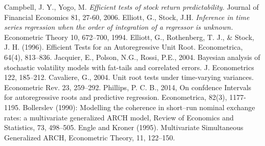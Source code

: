 \documentclass{article}
\begin{document}
\begin{thebibliography}{}

\bibitem{} 
{Campbell, J. Y., Yogo, M. }
\textit{Efficient tests of stock return predictability.} Journal of Financial Economics 81, 27-60, 2006.
\bibitem{} 
{Elliott, G., Stock, J.H.} \textit{Inference in time series regression when the order of integration of a regressor is
unknown.} Econometric Theory 10, 672–700,  1994.
\bibitem{} 
Elliott, G., Rothenberg, T. J., \& Stock, J. H. (1996). Efficient Tests for an Autoregressive Unit Root. Econometrica, 64(4), 813–836.
\bibitem{} 
Jacquier, E., Polson, N.G., Rossi, P.E., 2004. Bayesian analysis of stochastic volatility
models with fat-tails and correlated errors. J. Econometrics 122, 185–212.
\bibitem{} 
Cavaliere, G., 2004. Unit root tests under time-varying variances. Econometric Rev.
23, 259–292.
\bibitem{} 
Phillips, P. C. B., 2014, On confdence Intervals for autoregressive roots and predictive regression. Econometrica, 82(3), 1177-1195.
\bibitem{} 
Bollerslev (1990): Modelling the coherence in short–run nominal exchange rates: a multivariate generalized ARCH model, Review of Economics and Statistics, 73, 498–505.
\bibitem{} 
Engle and Kroner (1995). Multivariate Simultaneous Generalized ARCH, Econometric Theory, 11, 122–150.
\end{thebibliography}
\end{document}

